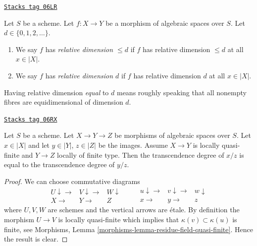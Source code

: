 \begin{definition}
\label{spaces-morphisms-definition-relative-dimension}
\href{https://stacks.math.columbia.edu/tag/06LR}{\texttt{Stacks tag 06LR}}

Let $S$ be a scheme.
Let $f : X \to Y$ be a morphism of algebraic spaces over $S$.
Let $d \in \{0, 1, 2, \ldots\}$.
\begin{enumerate}
\item We say $f$ has {\it relative dimension $\leq d$} if
$f$ has relative dimension $\leq d$ at all $x \in |X|$.
\item We say $f$ has {\it relative dimension $d$} if
$f$ has relative dimension $d$ at all $x \in |X|$.
\end{enumerate}
\end{definition}

Having relative dimension {\it equal} to $d$ means roughly speaking that all
nonempty fibres are equidimensional of dimension $d$.

\begin{lemma}
\label{spaces-morphisms-lemma-compare-tr-deg}
\href{https://stacks.math.columbia.edu/tag/06RX}{\texttt{Stacks tag 06RX}}

Let $S$ be a scheme. Let $X \to Y \to Z$ be morphisms of algebraic
spaces over $S$. Let $x \in |X|$ and let $y \in |Y|$, $z \in |Z|$
be the images. Assume $X \to Y$ is locally quasi-finite and $Y \to Z$
locally of finite type. Then the transcendence degree of $x/z$
is equal to the transcendence degree of $y/z$.
\end{lemma}

\begin{proof}
We can choose commutative diagrams
$$
\begin{array}{ccc}U \downarrow\longrightarrow & V \downarrow\longrightarrow & W \downarrow \\ X \longrightarrow & Y \longrightarrow & Z\end{array}
\quad\quad
\begin{array}{ccc}u \downarrow\longrightarrow & v \downarrow\longrightarrow & w \downarrow \\ x \longrightarrow & y \longrightarrow & z\end{array}
$$
where $U, V, W$ are schemes and the vertical arrows are \'etale.
By definition the morphism $U \to V$ is locally quasi-finite
which implies that $\kappa(v) \subset \kappa(u)$ is finite, see
Morphisms, Lemma \ref{morphisms-lemma-residue-field-quasi-finite}.
Hence the result is clear.
\end{proof}

